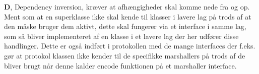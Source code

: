 \textbf{D}, Dependency inversion, kræver at afhængigheder skal komme nede fra og op. Ment som at en superklasse ikke skal kende til klasser i lavere lag på trods af at den måske bruger dem aktivt, dette skal fungerer via et interface i samme lag, som så bliver implementeret af en klasse i et lavere lag der her udfører disse handlinger. Dette er også indført i protokollen med de mange interfaces der f.eks. gør at protokol klassen ikke kender til de specifikke marshallers på trods af de bliver brugt når denne kalder encode funktionen på et marshaller interface. \\ 